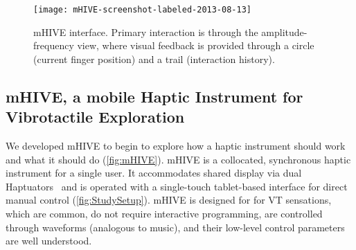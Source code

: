 %
%

\begin{figure}[Htb]
   \centering
	   \texttt{[image: mHIVE-screenshot-labeled-2013-08-13]} 
	   \caption{mHIVE interface. Primary interaction is through the amplitude-frequency view, where visual feedback is provided through a circle (current finger position) and a trail (interaction history).}
	   \label{fig:mHIVE}
    \end{figure}



\subsection{mHIVE, a mobile Haptic Instrument for Vibrotactile Exploration}
We developed mHIVE to begin to explore how a haptic instrument should work and what it should do %
(\autoref{fig:mHIVE}).
%
%
mHIVE is a collocated, synchronous haptic instrument for a single user. It accommodates shared display via dual
Haptuators~\cite{Yao2010}
and is operated with a single-touch tablet-based interface for direct manual control (\autoref{fig:StudySetup}). 
mHIVE is designed for for VT
sensations, which are common, do not require interactive programming, are controlled through waveforms (analogous to music), and their low-level control parameters are well understood.



